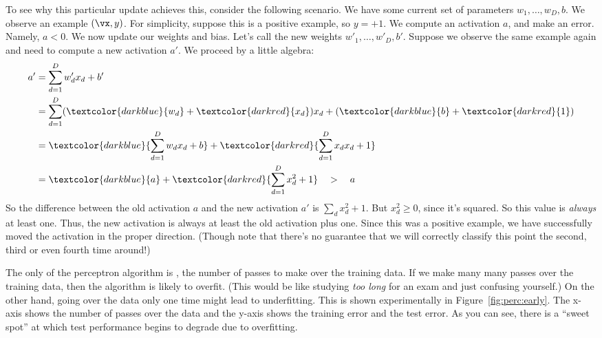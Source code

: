 To see why this particular update achieves this, consider the
following scenario.  We have some current set of parameters $w_1,
\dots, w_D, b$.  We observe an example $(\vx,y)$.  For simplicity,
suppose this is a positive example, so $y=+1$.  We compute an
activation $a$, and make an error.  Namely, $a<0$.  We now update our
weights and bias.  Let's call the new weights $w'_1, \dots, w'_D,
b'$.  Suppose we observe the same example again and need to compute a
new activation $a'$.  We proceed by a little algebra:
\begin{align}
a'
&= \sum_{d=1}^D w'_d x_d + b' \\
&= \sum_{d=1}^D (\textcolor{darkblue}{w_d} + \textcolor{darkred}{x_d}) x_d + (\textcolor{darkblue}{b} + \textcolor{darkred}{1}) \\
&= \textcolor{darkblue}{\sum_{d=1}^D w_d x_d + b} + \textcolor{darkred}{\sum_{d=1}^D x_d x_d + 1} \\
&= \textcolor{darkblue}{a} + \textcolor{darkred}{\sum_{d=1}^D x_d^2 + 1}
\quad > \quad a
\end{align}
So the difference between the old activation $a$ and the new
activation $a'$ is $\sum_d x_d^2 + 1$.  But $x_d^2 \geq 0$, since it's
squared.  So this value is \emph{always} at least one.  Thus, the new
activation is always at least the old activation plus one.  Since this
was a positive example, we have successfully moved the activation in
the proper direction.  (Though note that there's no guarantee that we
will correctly classify this point the second, third or even fourth
time around!)



The only  of the perceptron algorithm is
, the number of passes to make over the training data.
If we make many many passes over the training data, then the algorithm
is likely to overfit.  (This would be like studying \emph{too long}
for an exam and just confusing yourself.)  On the other hand, going
over the data only one time might lead to underfitting.  This is shown
experimentally in Figure~\ref{fig:perc:early}.  The x-axis shows the
number of passes over the data and the y-axis shows the training error
and the test error.  As you can see, there is a ``sweet spot'' at
which test performance begins to degrade due to overfitting.

